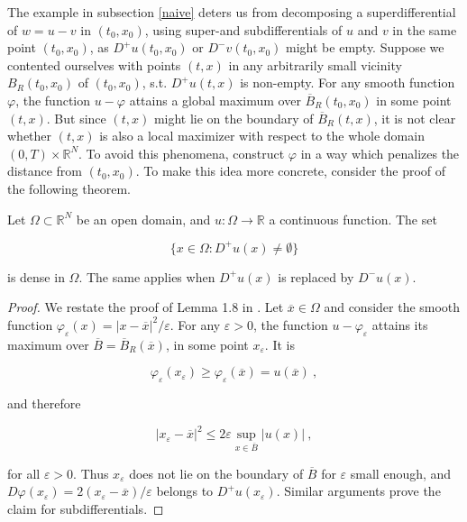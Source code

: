 The example in subsection \ref{naive} deters us from decomposing a superdifferential of $ w = u - v $ in $ (t_0, x_0) $, using super-and subdifferentials of $ u $ and $ v $ in the same point $ (t_0, x_0) $, as $ D^{+}u(t_0, x_0) $ or $ D^{-}v(t_0, x_0) $ might be empty. Suppose we contented ourselves with points $ (t, x) $ in any arbitrarily small vicinity $ B_R(t_0, x_0) $ of $ (t_0, x_0) $, s.t. $ D^{+}u(t, x) $ is non-empty. For any smooth function $ \varphi $, the function $ u - \varphi $ attains a global maximum over $ \overline{B}_R(t_0, x_0) $ in some point $ (t, x) $. But since $ (t, x) $ might lie on the boundary of $ \overline{B}_R(t, x) $, it is not clear whether $ (t, x) $ is also a local maximizer with respect to the whole domain $ \left( 0, T \right) \times \mathbb{R}^{N} $. To avoid this phenomena, construct $ \varphi $ in a way which penalizes the distance from $ (t_0, x_0) $. To make this idea more concrete, consider the proof of the following theorem.
		
		\begin{theorem}
			\label{density}
			Let $ \Omega \subset \mathbb{R}^{N} $ be an open domain, and $ u : \Omega \to \mathbb{R} $ a continuous function. The set
			
			\begin{equation*}
				\big\{ x \in \Omega : D^{+}u(x) \neq \emptyset \big\}
			\end{equation*}
			
			is dense in $ \Omega $. The same applies when $ D^{+}u(x) $ is replaced by $ D^{-}u(x) $.
			
			\begin{proof}
				We restate the proof of Lemma 1.8 in \cite[p.~30]{bardi2008optimal}. Let $ \overline{x} \in \Omega $ and consider the smooth function $ \varphi_{\varepsilon}(x) = \lvert x - \overline{x} \rvert^2 /  \varepsilon $. For any $ \varepsilon > 0 $, the function $ u - \varphi_{\varepsilon} $ attains its maximum over $ \overline{B} = \overline{B}_R(\overline{x}) $, in some point $ x_{\varepsilon} $. It is
				
				\begin{equation*}
					\varphi_{\varepsilon}(x_{\varepsilon}) \geq \varphi_{\varepsilon}(\overline{x}) = u(\overline{x}) \ ,
				\end{equation*}
				
				and therefore
				
				\begin{equation*}
					\lvert x_{\varepsilon} - \overline{x} \rvert^2 \leq 2 \varepsilon \sup\limits_{x \in \overline{B}} \lvert u(x) \rvert  \ ,
				\end{equation*}
				
				for all $ \varepsilon > 0 $. Thus $ x_{\varepsilon} $ does not lie on the boundary of $ \overline{B} $ for $ \varepsilon $ small enough, and $ D\varphi(x_{\varepsilon}) = 2(x_{\varepsilon} - \overline{x}) / \varepsilon $ belongs to $ D^{+}u(x_{\varepsilon}) $. Similar arguments prove the claim for subdifferentials.
			\end{proof}
		\end{theorem}
	
